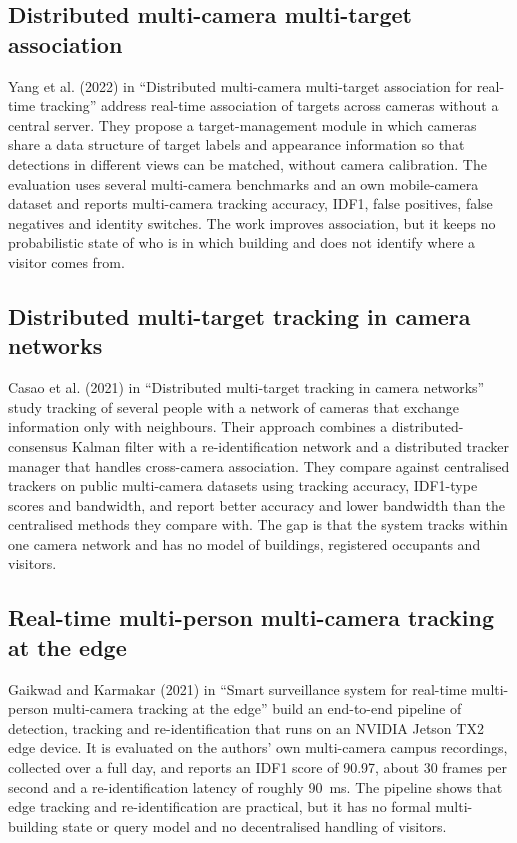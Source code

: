 \documentclass[12pt,a4paper,oneside]{report}
\begin{document}
\clearpage
\subsection{Distributed multi-camera multi-target association}
Yang et al. (2022) in ``Distributed multi-camera multi-target association for real-time tracking'' \cite{ref3} address real-time association of targets across cameras without a central server. They propose a target-management module in which cameras share a data structure of target labels and appearance information so that detections in different views can be matched, without camera calibration. The evaluation uses several multi-camera benchmarks and an own mobile-camera dataset and reports multi-camera tracking accuracy, IDF1, false positives, false negatives and identity switches. The work improves association, but it keeps no probabilistic state of who is in which building and does not identify where a visitor comes from.

\subsection{Distributed multi-target tracking in camera networks}
Casao et al. (2021) in ``Distributed multi-target tracking in camera networks'' \cite{ref4} study tracking of several people with a network of cameras that exchange information only with neighbours. Their approach combines a distributed-consensus Kalman filter with a re-identification network and a distributed tracker manager that handles cross-camera association. They compare against centralised trackers on public multi-camera datasets using tracking accuracy, IDF1-type scores and bandwidth, and report better accuracy and lower bandwidth than the centralised methods they compare with. The gap is that the system tracks within one camera network and has no model of buildings, registered occupants and visitors.

\clearpage
\subsection{Real-time multi-person multi-camera tracking at the edge}
Gaikwad and Karmakar (2021) in ``Smart surveillance system for real-time multi-person multi-camera tracking at the edge'' \cite{ref5} build an end-to-end pipeline of detection, tracking and re-identification that runs on an NVIDIA Jetson TX2 edge device. It is evaluated on the authors' own multi-camera campus recordings, collected over a full day, and reports an IDF1 score of 90.97, about 30 frames per second and a re-identification latency of roughly 90~ms. The pipeline shows that edge tracking and re-identification are practical, but it has no formal multi-building state or query model and no decentralised handling of visitors.
\end{document}
